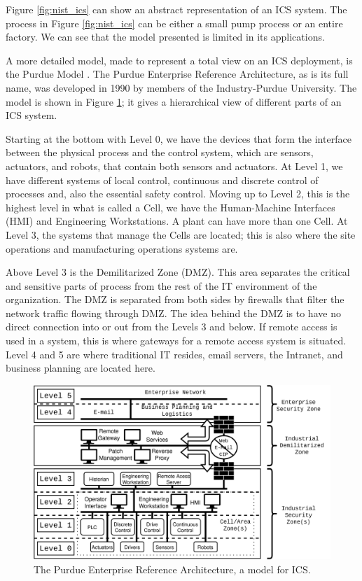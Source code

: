 Figure \ref{fig:nist_ics} can show an abstract representation of an ICS system. The process in Figure \ref{fig:nist_ics} can be either a small pump process or an entire factory. We can see that the model presented is limited in its applications. 

A more detailed model, made to represent a total view on an ICS deployment, is the Purdue Model \cite{williams1992purdue}. The Purdue Enterprise Reference Architecture, as is its full name, was developed in 1990 by members of the Industry-Purdue University. The model is shown in Figure \ref{fig:perdue}; it gives a hierarchical view of different parts of an ICS system. 

Starting at the bottom with Level 0, we have the devices that form the interface between the physical process and the control system, which are sensors, actuators, and robots, that contain both sensors and actuators. At Level 1, we have different systems of local control, continuous and discrete control of processes and, also the essential safety control. Moving up to Level 2, this is the highest level in what is called a Cell, we have the Human-Machine Interfaces (HMI) and Engineering Workstations. A plant can have more than one Cell. At Level 3, the systems that manage the Cells are located; this is also where the site operations and manufacturing operations systems are. 

Above Level 3 is the Demilitarized Zone (DMZ). This area separates the critical and sensitive parts of process from the rest of the IT environment of the organization. The DMZ is separated from both sides by firewalls that filter the network traffic flowing through DMZ. The idea behind the DMZ is to have no direct connection into or out from the Levels 3 and below. If remote access is used in a system, this is where gateways for a remote access system is situated. Level 4 and 5 are where traditional IT resides, email servers, the Intranet, and business planning are located here.

\begin{figure}[ht]
\centering
\includegraphics[width=\textwidth]{images/purdue.png}
\caption{The Purdue Enterprise Reference Architecture, a model for ICS.}
\label{fig:perdue}
\end{figure}

